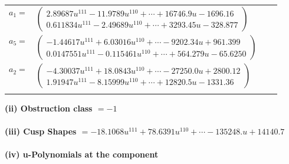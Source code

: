 \documentclass[1p]{elsarticle_modified}
\theoremstyle{definition}
\begin{document}
\begin{tabular}{m{7pt} m{180pt} m{7pt} m{180pt} }
\flushright $a_{1}=$&$\begin{pmatrix}2.89687 u^{111}-11.9789 u^{110}+\cdots+16746.9 u-1696.16\\0.611834 u^{111}-2.49689 u^{110}+\cdots+3293.45 u-328.877\end{pmatrix}$ \\
\flushright $a_{5}=$&$\begin{pmatrix}-1.44617 u^{111}+6.03016 u^{110}+\cdots-9202.34 u+961.399\\0.0147551 u^{111}-0.115461 u^{110}+\cdots+564.279 u-65.6250\end{pmatrix}$ \\
\flushright $a_{2}=$&$\begin{pmatrix}-4.30037 u^{111}+18.0843 u^{110}+\cdots-27250.0 u+2800.12\\1.91947 u^{111}-8.15999 u^{110}+\cdots+12820.5 u-1331.36\end{pmatrix}$\\&\end{tabular}
\flushleft \textbf{(ii) Obstruction class $= -1$}\\~\\
\flushleft \textbf{(iii) Cusp Shapes $= -18.1068 u^{111}+78.6391 u^{110}+\cdots-135248. u+14140.7$}\\~\\
\newpage\renewcommand{\arraystretch}{1}
\flushleft \textbf{(iv) u-Polynomials at the component}\newline \\
\end{document}
